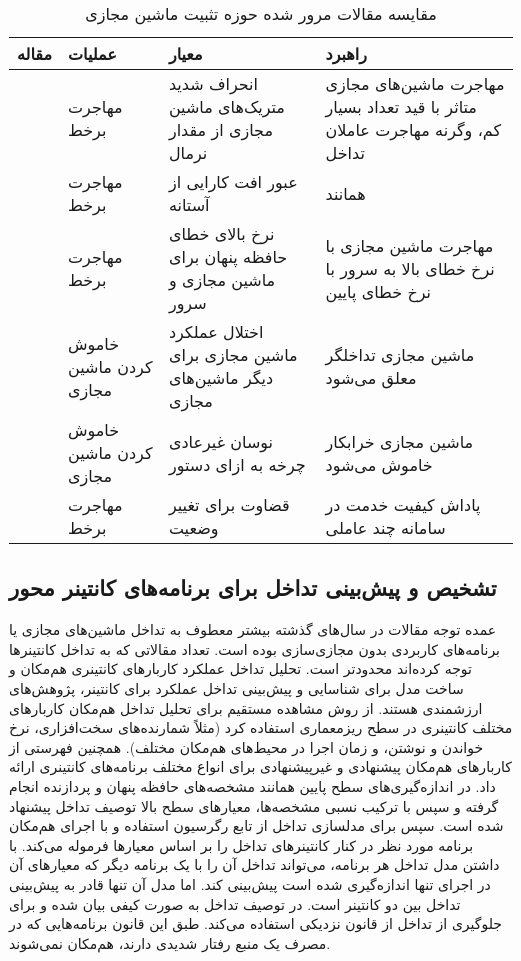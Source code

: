 \begin{table}[t]
\center
\caption{مقایسه مقالات مرور شده حوزه تثبیت ماشین مجازی}
\begin{tabular}{|c|R{3cm}|p{5cm}|p{5cm}|}
\hline
مقاله & عملیات & معیار & راهبرد \\
\hline
\hline
\cite{novakovic2013deepdive} & مهاجرت برخط & انحراف شدید متریک‌های ماشین مجازی از مقدار نرمال & مهاجرت ماشین‌های مجازی متاثر با قید تعداد بسیار کم، وگرنه مهاجرت عاملان تداخل \\
\cite{wang2015vmon} & مهاجرت برخط & عبور افت کارایی از آستانه & همانند \cite{novakovic2013deepdive} \\
\cite{ahn2012dynamic} & مهاجرت برخط & نرخ بالای خطای حافظه پنهان برای ماشین مجازی و سرور & مهاجرت ماشین مجازی با نرخ خطای  بالا به سرور با نرخ خطای  پایین \\
\cite{salimi2013batch} & خاموش کردن ماشین مجازی & اختلال عملکرد ماشین مجازی برای دیگر ماشین‌های مجازی & ماشین مجازی تداخلگر معلق می‌شود \\
\cite{Zhang2013CPI2} & خاموش کردن ماشین مجازی & نوسان غیرعادی چرخه به ازای دستور & ماشین مجازی خرابکار خاموش می‌شود \\
\cite{nishtala2020twig} & مهاجرت برخط & قضاوت  برای تغییر وضعیت & پاداش کیفیت خدمت در سامانه چند عاملی  \\
\hline
\end{tabular}
\label{table:litr_rev_consolidation}
\end{table}

\subsection{تشخیص و پیش‌بینی تداخل برای برنامه‌های کانتینر محور}

عمده توجه مقالات در سال‌های گذشته بیشتر معطوف به تداخل ماشین‌های مجازی یا برنامه‌های کاربردی بدون مجازی‌سازی بوده است. تعداد مقالاتی که به تداخل کانتینرها توجه کرده‌اند محدودتر است. تحلیل تداخل عملکرد کاربارهای کانتینری هم‌مکان و ساخت مدل برای شناسایی و پیش‌بینی تداخل عملکرد برای کانتینر، پژوهش‌های ارزشمندی هستند. \cite{chen2020interference} از روش مشاهده مستقیم برای تحلیل تداخل هم‌مکان کاربارهای مختلف کانتینری در سطح ریزمعماری استفاده کرد (مثلاً شمارنده‌های سخت‌افزاری، نرخ خواندن و نوشتن، و زمان اجرا در محیط‌های هم‌مکان مختلف). همچنین فهرستی از کاربارهای هم‌مکان پیشنهادی و غیرپیشنهادی برای انواع مختلف برنامه‌های کانتینری ارائه داد. در \cite{medel2023modeling} اندازه‌گیری‌های سطح پایین همانند مشخصه‌های حافظه پنهان و پردازنده انجام گرفته و سپس با ترکیب نسبی مشخصه‌ها، معیارهای سطح بالا توصیف تداخل پیشنهاد شده است. سپس برای مدلسازی تداخل از تابع رگرسیون استفاده و با اجرای هم‌مکان برنامه مورد نظر در کنار کانتینرهای  تداخل را بر اساس معیارها فرموله می‌کند. با داشتن مدل تداخل هر برنامه، می‌تواند تداخل آن را با یک برنامه دیگر که معیارهای آن در اجرای تنها اندازه‌گیری شده است پیش‌بینی کند. اما مدل آن تنها قادر به پیش‌بینی تداخل بین دو کانتینر است. در \cite{Kaur2020KEIDS} توصیف تداخل به صورت کیفی بیان شده و برای جلوگیری از تداخل از قانون نزدیکی استفاده می‌کند. طبق این قانون برنامه‌هایی که در مصرف یک منبع رفتار شدیدی دارند، هم‌مکان نمی‌شوند.

